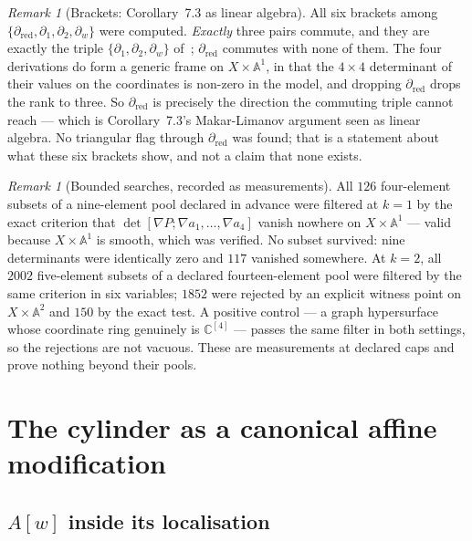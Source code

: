 \documentclass[11pt]{article}
\theoremstyle{definition}
\theoremstyle{remark}
\newtheorem{remark}[theorem]{Remark}
\newcommand{\C}{\mathbb{C}}
\newcommand{\Aff}[1]{\mathbb{A}^{#1}}
\begin{document}
\begin{remark}[Brackets: Corollary~7.3 as linear algebra]\label{rem:brackets}
All six brackets among $\{\partial_{\mathrm{red}},\partial_1,\partial_2,
\partial_w\}$ were computed. \emph{Exactly} three pairs commute, and they are
exactly the triple $\{\partial_1,\partial_2,\partial_w\}$
of~\cite[Cor.~7.3]{DMJP2009}; $\partial_{\mathrm{red}}$ commutes with none of
them. The four derivations do form a generic frame on $X\times\Aff{1}$, in
that the $4\times4$ determinant of their values on the coordinates is non-zero
in the model, and dropping $\partial_{\mathrm{red}}$ drops the rank to three.
So $\partial_{\mathrm{red}}$ is precisely the direction the commuting triple
cannot reach --- which is Corollary~7.3's Makar-Limanov argument seen as
linear algebra. No triangular flag through $\partial_{\mathrm{red}}$ was found;
that is a statement about what these six brackets show, and not a claim that
none exists.
\end{remark}

\begin{remark}[Bounded searches, recorded as
measurements]\label{rem:sweeps1}
All $126$ four-element subsets of a nine-element pool declared in advance were
filtered at $k=1$ by the exact criterion that
$\det[\nabla P;\nabla a_1,\dots,\nabla a_4]$ vanish nowhere on
$X\times\Aff{1}$ --- valid because $X\times\Aff{1}$ is smooth, which was
verified. No subset survived: nine determinants were identically zero and
$117$ vanished somewhere. At $k=2$, all $2002$ five-element subsets of a
declared fourteen-element pool were filtered by the same criterion in six
variables; $1852$ were rejected by an explicit witness point on
$X\times\Aff{2}$ and $150$ by the exact test. A positive control --- a graph
hypersurface whose coordinate ring genuinely is $\C^{[4]}$ --- passes the same
filter in both settings, so the rejections are not vacuous. These are
measurements at declared caps and prove nothing beyond their pools.
\end{remark}

\section{The cylinder as a canonical affine modification}\label{sec:modification}

\subsection{$A[w]$ inside its localisation}
\end{document}
